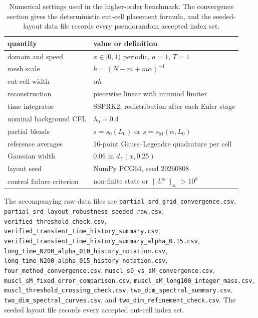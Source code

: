 \documentclass[preprint,12pt]{elsarticle}
\begin{document}
\begin{table}[ht]
\centering
\small
\begin{tabular}{ll}
quantity & value or definition \\
\hline
domain and speed & $x\in[0,1)$ periodic, $a=1$, $T=1$ \\
mesh scale & $h=(N-m+m\alpha)^{-1}$ \\
cut-cell width & $\alpha h$ \\
reconstruction & piecewise linear with minmod limiter \\
time integrator & SSPRK2, redistribution after each Euler stage \\
nominal background CFL & $\lambda_0=0.4$ \\
partial blends & $s=s_0(L_0)$ or $s=s_{\mathrm M}(\alpha,L_0)$ \\
reference averages & 16-point Gauss--Legendre quadrature per cell \\
Gaussian width & $0.06$ in $d_{\mathbb T}(x,0.25)$ \\
layout seed & NumPy PCG64, seed $20260808$ \\
control failure criterion & non-finite state or $\|U^n\|_\infty>10^8$ \\
\end{tabular}
\caption{Numerical settings used in the higher-order benchmark.  The
convergence section gives the deterministic cut-cell placement formula, and
the seeded-layout data file records every pseudorandom accepted index set.}
\label{tab:reproducibility}
\end{table}

The accompanying raw-data files are
\texttt{partial\_srd\_grid\_convergence.csv},
\texttt{partial\_srd\_layout\_robustness\_seeded\_raw.csv},
\texttt{verified\_threshold\_check.csv},
\texttt{verified\_transient\_time\_history\_summary.csv},
\texttt{verified\_transient\_time\_history\_summary\_alpha\_0.15.csv},
\texttt{long\_time\_N200\_alpha\_010\_history\_notation.csv},
\texttt{long\_time\_N200\_alpha\_015\_history\_notation.csv},
\texttt{four\_method\_convergence.csv},
\texttt{muscl\_s0\_vs\_sM\_convergence.csv},
\texttt{muscl\_sM\_fixed\_error\_comparison.csv},
\texttt{muscl\_sM\_long100\_integer\_mass.csv},
\texttt{muscl\_threshold\_crossing\_check.csv},
\texttt{two\_dim\_spectral\_summary.csv},
\texttt{two\_dim\_spectral\_curves.csv}, and
\texttt{two\_dim\_refinement\_check.csv}.  The seeded
layout file records every accepted cut-cell index set.

\clearpage
\end{document}

